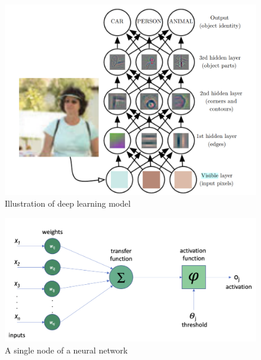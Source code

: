 \begin{figure}[t]
	\centering
	\includegraphics[width=\textwidth]{content/imgs/deep_learning_feature}
	\caption{Illustration of deep learning model \cite{Goodfellow-et-al-2016}}
	\label{fig:deep learning model}
\end{figure}



\begin{figure}[h]
	\centering
	\includegraphics[width=\textwidth]{content/imgs/neuron}
	\caption{A single node of a neural network}
	\label{fig: neuron}
\end{figure}

